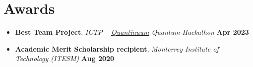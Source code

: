\section{Awards}
\begin{itemize}
    \item \textbf{Best Team Project}, \textit{ICTP -- \href{https://www.quantinuum.com/about}{Quantinuum} Quantum Hackathon} \hfill {\bf Apr 2023}
    \item \textbf{Academic Merit Scholarship recipient}, \textit{ Monterrey Institute of Technology (ITESM)} \hfill {\bf Aug 2020}
\end{itemize}